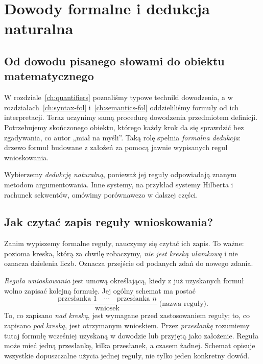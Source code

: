 \chapter{Dowody formalne i dedukcja naturalna}\label{ch:natural-deduction}

\section{Od dowodu pisanego słowami do obiektu matematycznego}
W rozdziale~\ref{ch:quantifiers} poznaliśmy typowe techniki dowodzenia,
a w rozdziałach~\ref{ch:syntax-fol} i~\ref{ch:semantics-fol}
oddzieliliśmy formuły od ich interpretacji. Teraz uczynimy
samą procedurę dowodzenia przedmiotem definicji.
Potrzebujemy skończonego obiektu, którego każdy krok da się sprawdzić
bez zgadywania, co autor „miał na myśli”. Taką rolę spełnia
\emph{formalna dedukcja}: drzewo formuł budowane z założeń
za pomocą jawnie wypisanych reguł wnioskowania.

Wybierzemy \emph{dedukcję naturalną}, ponieważ jej reguły
odpowiadają znanym metodom argumentowania. Inne systemy,
na przykład systemy Hilberta i rachunek sekwentów, omówimy
porównawczo w dalszej części.

\section{Jak czytać zapis reguły wnioskowania?}\label{sec:nd-how-to-read}
Zanim wypiszemy formalne reguły, nauczymy się czytać ich zapis.
To ważne: pozioma kreska, którą za chwilę zobaczymy, \emph{nie jest kreską ułamkową}
i nie oznacza dzielenia liczb. Oznacza przejście od podanych zdań do nowego zdania.

\begin{definicja}\label{def:nd-rule-scheme}
\emph{Reguła wnioskowania} jest umową określającą, kiedy z już uzyskanych
formuł wolno zapisać kolejną formułę. Jej ogólny schemat ma postać
\[
 \frac{\text{przesłanka 1}\quad\cdots\quad\text{przesłanka }n}
      {\text{wniosek}}\;\text{(nazwa reguły)}.
\]
To, co zapisano \emph{nad kreską}, jest wymagane przed zastosowaniem reguły;
to, co zapisano \emph{pod kreską}, jest otrzymanym wnioskiem.
Przez \emph{przesłankę} rozumiemy tutaj formułę wcześniej uzyskaną w dowodzie
lub przyjętą jako założenie. Reguła może mieć jedną przesłankę, kilka przesłanek,
a czasem żadnej. Schemat opisuje wszystkie dopuszczalne użycia jednej reguły,
nie tylko jeden konkretny dowód.
\end{definicja}

